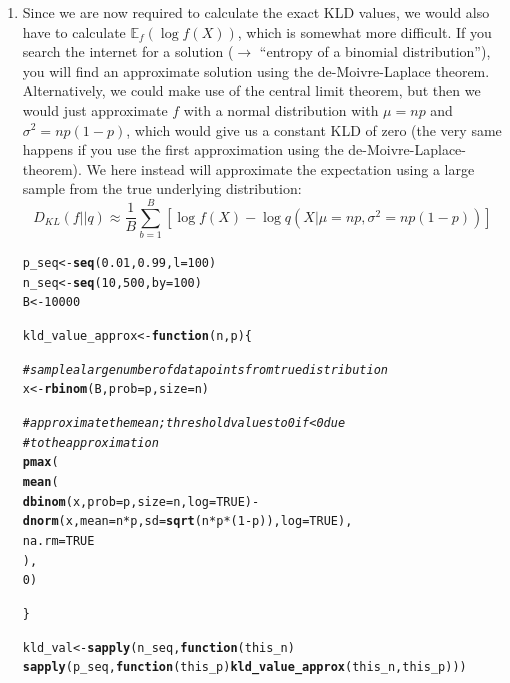 \documentclass[a4paper]{article}
\makeatletter
\newcommand{\hlnum}[1]{\textcolor[rgb]{0.686,0.059,0.569}{#1}}%
\newcommand{\hlcom}[1]{\textcolor[rgb]{0.678,0.584,0.686}{\textit{#1}}}%
\newcommand{\hlopt}[1]{\textcolor[rgb]{0,0,0}{#1}}%
\newcommand{\hlstd}[1]{\textcolor[rgb]{0.345,0.345,0.345}{#1}}%
\newcommand{\hlkwa}[1]{\textcolor[rgb]{0.161,0.373,0.58}{\textbf{#1}}}%
\newcommand{\hlkwb}[1]{\textcolor[rgb]{0.69,0.353,0.396}{#1}}%
\newcommand{\hlkwc}[1]{\textcolor[rgb]{0.333,0.667,0.333}{#1}}%
\newcommand{\hlkwd}[1]{\textcolor[rgb]{0.737,0.353,0.396}{\textbf{#1}}}%
\newenvironment{kframe}{%
 \def\at@end@of@kframe{}%
 \ifinner\ifhmode%
  \def\at@end@of@kframe{\end{minipage}}%
  \begin{minipage}{\columnwidth}%
 \fi\fi%
 \def\FrameCommand##1{\hskip\@totalleftmargin \hskip-\fboxsep
 \colorbox{shadecolor}{##1}\hskip-\fboxsep
     \hskip-\linewidth \hskip-\@totalleftmargin \hskip\columnwidth}%
 \MakeFramed {\advance\hsize-\width
   \@totalleftmargin\z@ \linewidth\hsize
   \@setminipage}}%
 {\par\unskip\endMakeFramed%
 \at@end@of@kframe}
\newenvironment{knitrout}{}{} %
\makeatother
\begin{document}
{\begin{enumerate}
\item Since we are now required to calculate the exact KLD values, we would also have to calculate $\mathbb{E}_f(\log f(X))$, which is somewhat more difficult. If you search the internet for a solution ($\rightarrow$ ``entropy of a binomial distribution''), you will find an approximate solution using the de-Moivre-Laplace theorem. Alternatively, we could make use of the central limit theorem, but then we would just approximate $f$ with a normal distribution with $\mu = np$ and $\sigma^2 = np(1-p)$, which would give us a constant KLD of zero (the very same happens if you use the first approximation using the de-Moivre-Laplace-theorem). We here instead will approximate the expectation using a large sample from the true underlying distribution:
$$
D_{KL}(f||q) \approx \frac{1}{B} \sum_{b=1}^B [\log f(X) - \log q(X|\mu = np, \sigma^2 = np(1-p))]
$$
\begin{knitrout}
\color{fgcolor}\begin{kframe}
\begin{alltt}
\hlstd{p_seq} \hlkwb{<-} \hlkwd{seq}\hlstd{(}\hlnum{0.01}\hlstd{,} \hlnum{0.99}\hlstd{,} \hlkwc{l} \hlstd{=} \hlnum{100}\hlstd{)}
\hlstd{n_seq} \hlkwb{<-} \hlkwd{seq}\hlstd{(}\hlnum{10}\hlstd{,} \hlnum{500}\hlstd{,} \hlkwc{by} \hlstd{=} \hlnum{100}\hlstd{)}
\hlstd{B} \hlkwb{<-} \hlnum{10000}

\hlstd{kld_value_approx} \hlkwb{<-} \hlkwa{function}\hlstd{(}\hlkwc{n}\hlstd{,}\hlkwc{p}\hlstd{)\{}

  \hlcom{# sample a large number of data points from true distribution}
  \hlstd{x} \hlkwb{<-} \hlkwd{rbinom}\hlstd{(B,} \hlkwc{prob} \hlstd{= p,} \hlkwc{size} \hlstd{= n)}

  \hlcom{# approximate the mean; threshold values to 0 if < 0 due}
  \hlcom{# to the approximation}
  \hlkwd{pmax}\hlstd{(}
    \hlkwd{mean}\hlstd{(}
      \hlkwd{dbinom}\hlstd{(x,} \hlkwc{prob} \hlstd{= p,} \hlkwc{size} \hlstd{= n,} \hlkwc{log} \hlstd{=} \hlnum{TRUE}\hlstd{)} \hlopt{-}
        \hlkwd{dnorm}\hlstd{(x,} \hlkwc{mean} \hlstd{= n}\hlopt{*}\hlstd{p,} \hlkwc{sd} \hlstd{=} \hlkwd{sqrt}\hlstd{(n}\hlopt{*}\hlstd{p}\hlopt{*}\hlstd{(}\hlnum{1}\hlopt{-}\hlstd{p)),} \hlkwc{log} \hlstd{=} \hlnum{TRUE}\hlstd{),}
      \hlkwc{na.rm} \hlstd{=} \hlnum{TRUE}
    \hlstd{),}
    \hlnum{0}\hlstd{)}

\hlstd{\}}

\hlstd{kld_val} \hlkwb{<-} \hlkwd{sapply}\hlstd{(n_seq,} \hlkwa{function}\hlstd{(}\hlkwc{this_n}\hlstd{)}
  \hlkwd{sapply}\hlstd{(p_seq,} \hlkwa{function}\hlstd{(}\hlkwc{this_p}\hlstd{)} \hlkwd{kld_value_approx}\hlstd{(this_n, this_p)))}


\end{alltt}
\end{kframe}
\end{knitrout}
\end{enumerate}}
\end{document}
